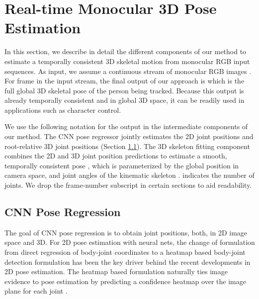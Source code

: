\documentclass[acmtog]{acmart}
\begin{document}
\section{Real-time Monocular 3D Pose Estimation}
In this section, we describe in detail the different components of our method to estimate a temporally consistent 3D skeletal motion from monocular RGB input sequences.
As input, we assume a continuous stream of monocular RGB images .
For frame  in the input stream, the final output of our approach is  which is the full global 3D skeletal pose of the person being tracked.
Because this output is already temporally consistent and in global 3D space, it can be readily used in applications such as character control.


We use the following notation for the output in the intermediate components of our method.
The CNN pose regressor jointly estimates the 2D joint positions  and root-relative 3D joint positions  (Section \ref{sec:network}).
The 3D skeleton fitting component combines the 2D and 3D joint position predictions to estimate a smooth, temporally consistent pose , which is parameterized by the global position  in camera space, and joint angles  of the kinematic skeleton .  indicates the number of joints. We drop the frame-number subscript  in certain sections to aid readability.


\subsection{CNN Pose Regression}
\label{sec:network}	

The goal of CNN pose regression is to obtain joint positions, both, in 2D image space and 3D.
For 2D pose estimation with neural nets, the change of formulation from direct regression of  body-joint coordinates \cite{toshev_deeppose_cvpr14} to a heatmap based body-joint detection formulation \cite{tompson_cnn_graph_pose_nips14} has been the key driver behind the recent developments in 2D pose estimation. The heatmap based formulation naturally ties image evidence to pose estimation by predicting a confidence heatmap  over the image plane for each joint .
\end{document}
